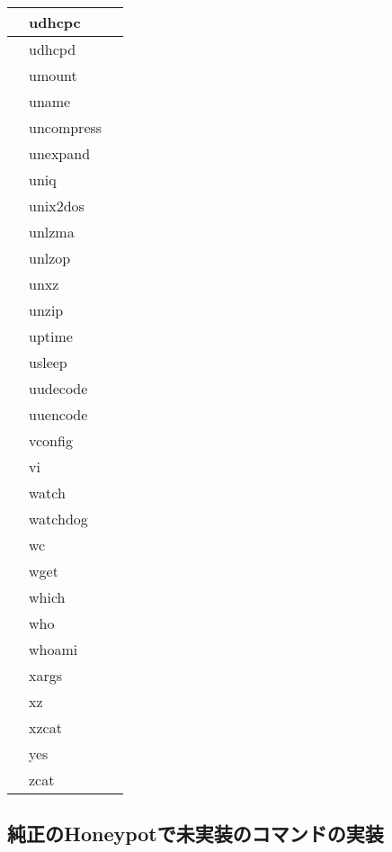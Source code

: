 \begin{longtable}{llp{50mm}}
 & udhcpc &  \\ \hline
 & udhcpd &  \\ \hline
 & umount &  \\ \hline
 & uname &  \\ \hline
 & uncompress &  \\ \hline
 & unexpand &  \\ \hline
 & uniq &  \\ \hline
 & unix2dos &  \\ \hline
 & unlzma &  \\ \hline
 & unlzop &  \\ \hline
 & unxz &  \\ \hline
 & unzip &  \\ \hline
 & uptime &  \\ \hline
 & usleep &  \\ \hline
 & uudecode &  \\ \hline
 & uuencode &  \\ \hline
 & vconfig &  \\ \hline
 & vi &  \\ \hline
 & watch &  \\ \hline
 & watchdog &  \\ \hline
 & wc &  \\ \hline
 & wget &  \\ \hline
 & which &  \\ \hline
 & who &  \\ \hline
 & whoami &  \\ \hline
 & xargs &  \\ \hline
 & xz &  \\ \hline
 & xzcat &  \\ \hline
 & yes &  \\ \hline
 & zcat &  \\ \hline

\end{longtable}

\subsection{純正のHoneypotで未実装のコマンドの実装}
\label{appd:implofcommand}

